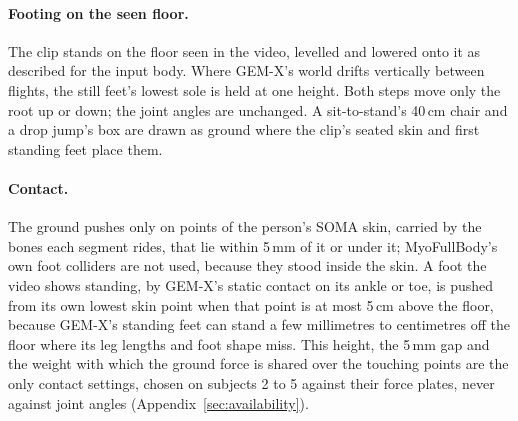 \documentclass[11pt]{article}
\begin{document}
\paragraph{Footing on the seen floor.} The clip stands on the floor seen in the video, levelled and lowered onto it as
described for the input body. Where GEM-X's world drifts vertically
between flights, the still feet's lowest sole is held at one height. Both steps move only the root up or down; the
joint angles are unchanged. A sit-to-stand's 40\,cm chair \cite{uhlrich2023opencap} and a drop jump's box are drawn as
ground where the clip's seated skin and first standing feet place them.

\paragraph{Contact.} The ground pushes only on points of the person's SOMA skin, carried by the bones each segment
rides, that lie within 5\,mm of it or under it; MyoFullBody's own foot colliders are not used, because they stood
inside the skin. A foot the video shows standing, by GEM-X's static contact on its ankle or toe, is pushed from its own
lowest skin point when that point is at most 5\,cm above the floor, because GEM-X's standing feet can stand a few
millimetres to centimetres off the floor where its leg lengths and foot shape miss. This height, the 5\,mm gap and the
weight with which the ground force is shared over the touching points are the only contact settings, chosen on
subjects 2 to 5 against their force plates, never against joint angles (Appendix~\ref{sec:availability}).
\end{document}
